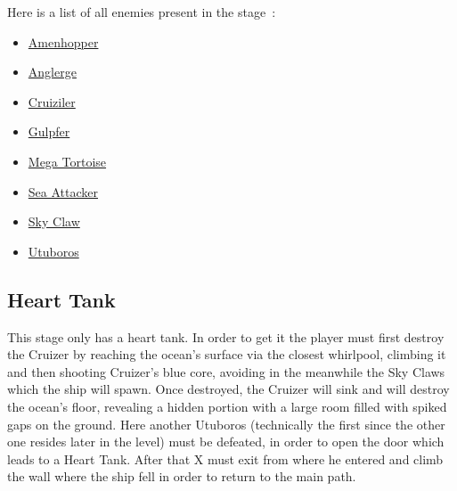 Here is a list of all enemies present in the stage~\cite{wiki:Ocean}:
\begin{itemize}
	\item \hyperlink{enem:Amenhopper}{Amenhopper}
	\item \hyperlink{miniboss:Anglerge}{Anglerge}
	\item \hyperlink{miniboss:Cruiziler}{Cruiziler}
	\item \hyperlink{enem:Gulpfer}{Gulpfer }
	\item \hyperlink{enem:Mega_Tortoise}{Mega Tortoise }
	\item \hyperlink{enem:Sea_Attacker}{Sea Attacker}
	\item \hyperlink{enem:Sky_Claw}{Sky Claw }
	\item \hyperlink{miniboss:Utuboros}{Utuboros}
\end{itemize}

\subsection{Heart Tank}
This stage only has a heart tank. In order to get it the player must first destroy the Cruizer by reaching the ocean's surface via the closest whirlpool, climbing it and then shooting Cruizer's blue core, avoiding in the meanwhile the Sky Claws which the ship will spawn. Once destroyed, the Cruizer will sink and will destroy the ocean's floor, revealing a hidden portion with a large room filled with spiked gaps on the ground. Here another Utuboros (technically the first since the other one resides later in the level) must be defeated, in order to open the door which leads to a Heart Tank. After that X must exit from where he entered and climb the wall where the ship fell in order to return to the main path.


